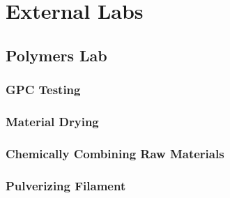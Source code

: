 \section{External Labs\label{methedology:externalLabs}}


\subsection{Polymers Lab\label{sec:methedology:externalLabs:polymersLab}}

\subsubsection{GPC Testing\label{sec:methedology:externalLabs:polymersLab:gpcTesting}}

\subsubsection{Material Drying\label{sec:methedology:externalLabs:polymersLab:materialDrying}}

\subsubsection{Chemically Combining Raw Materials\label{sec:methedology:externalLabs:polymersLab:chemicallyCombining}}

\subsubsection{Pulverizing Filament\label{sec:methedology:externalLabs:polymersLab:pulverizingFilament}}

